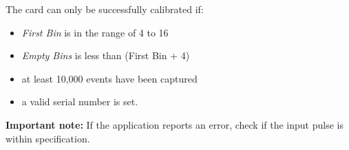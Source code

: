         The card can only be successfully calibrated if:

        \begin{itemize}
            \item \textit{First Bin} is in the range of 4 to 16
            \item \textit{Empty Bins} is less than (First Bin + 4)
            \item at least 10,000 events have been captured
            \item a valid serial number is set.
        \end{itemize}

        \textbf{Important note:} If the application reports an error, check if the input pulse is within specification.

